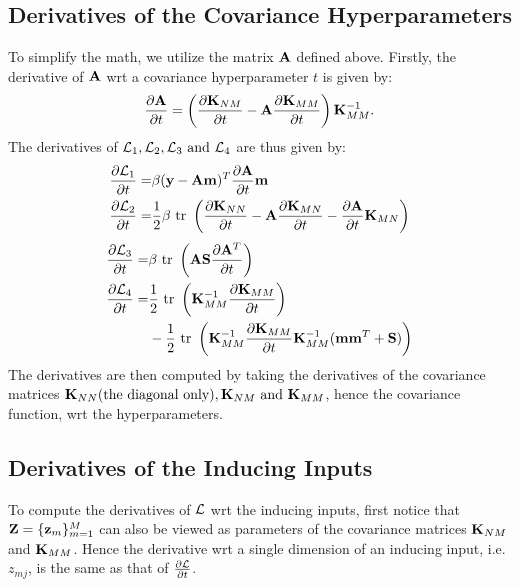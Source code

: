 \documentclass[]{article}
\begin{document}
\subsection{Derivatives of the Covariance Hyperparameters}  
To simplify the math, we utilize the matrix $\mathbf{A}$ defined above.
Firstly, the derivative of $\mathbf{A}$ wrt a covariance hyperparameter $t$ is given by:
\begin{align}
\frac{\partial{\mathbf{A}}}{\partial{t}} = \left(\frac{\partial{\mathbf{K}_{NM}}}{\partial{t}} - \mathbf{A} \frac{\partial{\mathbf{K}_{MM}}}{\partial{t}}\right)\mathbf{K}_{MM}^{-1}.
\end{align}
The derivatives of $\mathcal{L}_1, \mathcal{L}_2, \mathcal{L}_3 \text{ and } \mathcal{L}_4$ are thus given by:
\begin{align}
\frac{\partial{\mathcal{L}_1}}{\partial{t}} =& \beta (\mathbf{y} - \mathbf{A}\mathbf{m})^T \frac{\partial{\mathbf{A}}}{\partial{t}} \mathbf{m} \\
\frac{\partial{\mathcal{L}_2}}{\partial{t}} =& \frac{1}{2}\beta \mbox{ \rm tr } \left(\frac{\partial{\mathbf{K}_{NN}}}{\partial{t}} - \mathbf{A} \frac{\partial{\mathbf{K}_{MN}}}{\partial{t}} - \frac{\partial{\mathbf{A}}}{\partial{t}} \mathbf{K}_{MN}\right)
\end{align}
\begin{align}
\frac{\partial{\mathcal{L}_3}}{\partial{t}} =& \beta \mbox{ \rm tr } \left(\mathbf{A} \mathbf{S} \frac{\partial{\mathbf{A}^T}}{\partial{t}} \right) \\
\nonumber
\frac{\partial{\mathcal{L}_4}}{\partial{t}} =& \frac{1}{2}  \mbox{ \rm tr } \left(\mathbf{K}_{MM}^{-1} \frac{\partial{ \mathbf{K}_{MM}}}{\partial{t}}\right) \\
&- \frac{1}{2} \mbox{ \rm tr } \left(\mathbf{K}_{MM}^{-1} \frac{\partial{\mathbf{K}_{MM}}}{\partial{t}} \mathbf{K}_{MM}^{-1} (\mathbf{m} \mathbf{m}^T + \mathbf{S}) \right) 
\end{align}
The derivatives are then computed by taking the derivatives of the covariance matrices $\mathbf{K}_{NN} (\text{the diagonal only}), \mathbf{K}_{NM} \text{ and }  \mathbf{K}_{MM}$, hence the covariance function, wrt the hyperparameters. 

\subsection{Derivatives of the Inducing Inputs}
To compute the derivatives of $\mathcal{L}$ wrt the inducing inputs, first notice that $\mathbf{Z} = \{\mathbf{z}_m\}_{m=1}^M$ can also be viewed as parameters of the covariance matrices $\mathbf{K}_{NM}$ and $\mathbf{K}_{MM}$.
Hence the derivative wrt a single dimension of an inducing input, i.e. $z_{mj}$, is the same as that of $\frac{\partial{ \mathcal{L}}}{\partial{t}}$.
\end{document}
